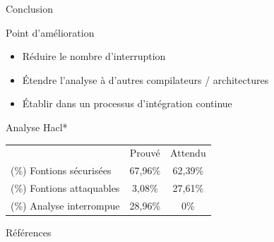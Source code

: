\documentclass{backend/backend}
\begin{document}
\begin{frame}{Conclusion}

    \begin{blockSimple}{Point d'amélioration}
        \begin{itemize}
            \item Réduire le nombre d'interruption
            \item Étendre l'analyse à d'autres compilateurs / architectures
            \item Établir dans un processus d'intégration continue
        \end{itemize}
    \end{blockSimple}

    \begin{blockSimple}{Analyse Hacl*}
        \begin{tabular}{l|c|c}
            & Prouvé & Attendu \\
            \rowcolor{lightgray}
            \hline
            (\%) Fontions sécurisées & 67,96\% & 62,39\% \\
            (\%) Fontions attaquables & 3,08\% & 27,61\% \\
            \rowcolor{lightgray}
            (\%) Analyse interrompue & 28,96\% & 0\% \\    
        \end{tabular}
    \end{blockSimple}
\end{frame}



\begin{frame}{Références}
    \tiny
    \printbibliography[keyword=oral]
\end{frame}
\end{document}
